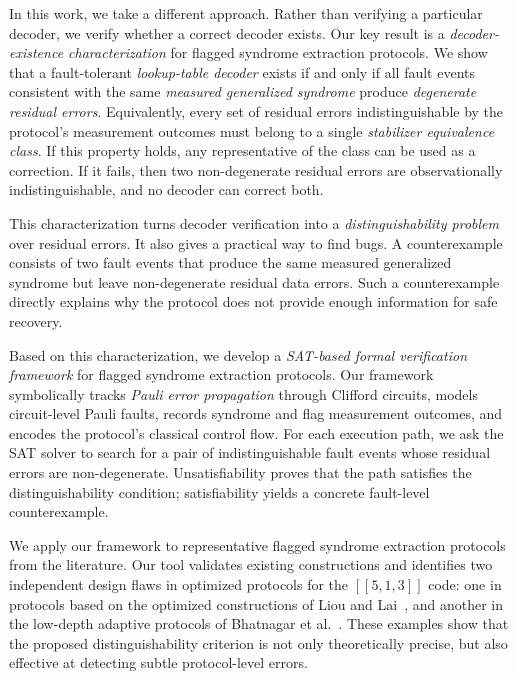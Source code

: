 \documentclass[acmsmall,screen,review,anonymous,nonacm]{acmart}
\begin{document}
In this work, we take a different approach. Rather than verifying a particular decoder, we verify whether a correct decoder exists. Our key result is a \emph{decoder-existence characterization} for flagged syndrome extraction protocols. We show that a fault-tolerant \emph{lookup-table decoder} exists if and only if all fault events consistent with the same \emph{measured generalized syndrome} produce \emph{degenerate residual errors}. Equivalently, every set of residual errors indistinguishable by the protocol's measurement outcomes must belong to a single \emph{stabilizer equivalence class}. If this property holds, any representative of the class can be used as a correction. If it fails, then two non-degenerate residual errors are observationally indistinguishable, and no decoder can correct both.

This characterization turns decoder verification into a \emph{distinguishability problem} over residual errors. It also gives a practical way to find bugs. A counterexample consists of two fault events that produce the same measured generalized syndrome but leave non-degenerate residual data errors. Such a counterexample directly explains why the protocol does not provide enough information for safe recovery.

Based on this characterization, we develop a \emph{SAT-based formal verification framework} for flagged syndrome extraction protocols. Our framework symbolically tracks \emph{Pauli error propagation} through Clifford circuits, models circuit-level Pauli faults, records syndrome and flag measurement outcomes, and encodes the protocol's classical control flow. For each execution path, we ask the SAT solver to search for a pair of indistinguishable fault events whose residual errors are non-degenerate. Unsatisfiability proves that the path satisfies the distinguishability condition; satisfiability yields a concrete fault-level counterexample.

We apply our framework to representative flagged syndrome extraction protocols from the literature. Our tool validates existing constructions and identifies two independent design flaws in optimized protocols for the $[[5,1,3]]$ code: one in protocols based on the optimized constructions of Liou and Lai~\cite{Liou25}, and another in the low-depth adaptive protocols of Bhatnagar et al.~\cite{low-depth}. These examples show that the proposed distinguishability criterion is not only theoretically precise, but also effective at detecting subtle protocol-level errors.
\end{document}
